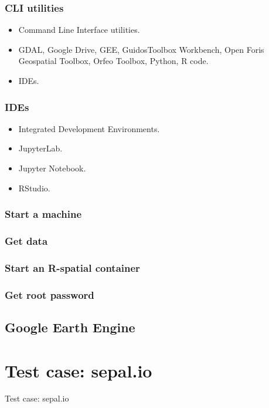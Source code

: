 \documentclass[aspectratio=169]{beamer}
\begin{document}
\begin{frame}
    \frametitle{CLI utilities}
    \begin{itemize}
        \item Command Line Interface utilities.
        \item GDAL, Google Drive, GEE, GuidosToolbox Workbench, Open Foris 
            Geospatial Toolbox, Orfeo Toolbox, Python, R code.
        \item IDEs.
    \end{itemize}
\end{frame}

\begin{frame}
    \frametitle{IDEs}
    \begin{itemize}
        \item Integrated Development Environments.
        \item JupyterLab.
        \item Jupyter Notebook.
        \item RStudio.
    \end{itemize}
\end{frame}

\begin{frame}
    \frametitle{Start a machine}
\end{frame}

\begin{frame}
    \frametitle{Get data}
\end{frame}

\begin{frame}
   \frametitle{Start an R-spatial container} 
\end{frame}

\begin{frame}
   \frametitle{Get root password} 
\end{frame}


\subsection{Google Earth Engine}



\section{Test case: sepal.io}



\begin{frame}
    Test case: sepal.io
\end{frame}
\end{document}
